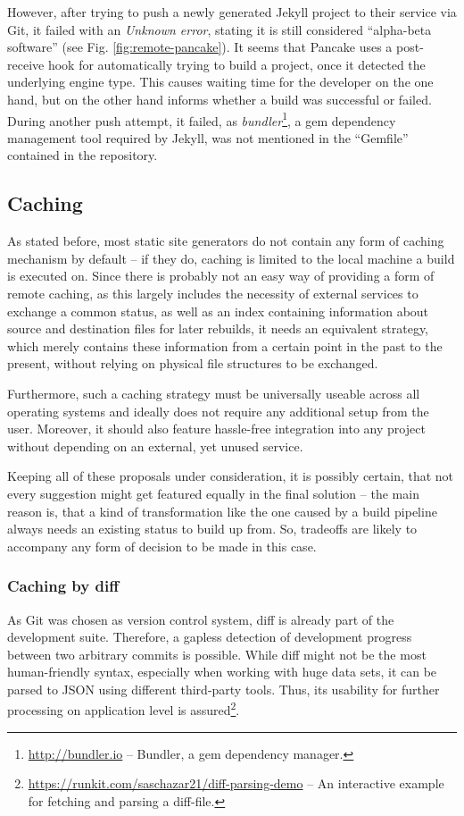 However, after trying to push a newly generated Jekyll project to their service via Git, it failed with an \emph{Unknown error}, stating it is still considered ``alpha-beta software'' (see Fig. \ref{fig:remote-pancake}). It seems that Pancake uses a post-receive hook for automatically trying to build a project, once it detected the underlying engine type. This causes waiting time for the developer on the one hand, but on the other hand informs whether a build was successful or failed. During another push attempt, it failed, as \emph{bundler}\footnote{\url{http://bundler.io} -- Bundler, a gem dependency manager.}, a gem dependency management tool required by Jekyll, was not mentioned in the ``Gemfile'' contained in the repository.


\subsection{Caching}
\label{sec:solutions-caching}

As stated before, most static site generators do not contain any form of caching mechanism by default -- if they do, caching is limited to the local machine a build is executed on. Since there is probably not an easy way of providing a form of remote caching, as this largely includes the necessity of external services to exchange a common status, as well as an index containing information about source and destination files for later rebuilds, it needs an equivalent strategy, which merely contains these information from a certain point in the past to the present, without relying on physical file structures to be exchanged.

Furthermore, such a caching strategy must be universally useable across all operating systems and ideally does not require any additional setup from the user. Moreover, it should also feature hassle-free integration into any project without depending on an external, yet unused service.

Keeping all of these proposals under consideration, it is possibly certain, that not every suggestion might get featured equally in the final solution -- the main reason is, that a kind of transformation like the one caused by a build pipeline always needs an existing status to build up from. So, tradeoffs are likely to accompany any form of decision to be made in this case.

\subsubsection{Caching by diff}
As Git was chosen as version control system, diff is already part of the development suite. Therefore, a gapless detection of development progress between two arbitrary commits is possible. While diff might not be the most human-friendly syntax, especially when working with huge data sets, it can be parsed to JSON using different third-party tools. Thus, its usability for further processing on application level is assured\footnote{\url{https://runkit.com/saschazar21/diff-parsing-demo} -- An interactive example for fetching and parsing a diff-file.}.

